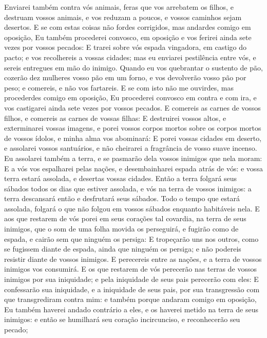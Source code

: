 {{  Enviarei também contra vós animais, feras que vos arrebatem os filhos, e destruam vossos animais, e vos reduzam a poucos, e vossos caminhos sejam desertos.
  E se com estas coisas não fordes corrigidos, mas andardes comigo em oposição, %
  Eu também procederei convosco, em oposição e vos ferirei ainda sete vezes por vossos pecados:
  E trarei sobre vós espada vingadora, em castigo do pacto; e vos recolhereis a vossas cidades; mas eu enviarei pestilência entre vós, e sereis entregues em mão do inimigo.
  Quando eu vos quebrantar o sustento de pão, cozerão dez mulheres vosso pão em um forno, e vos devolverão vosso pão por peso; e comereis, e não vos fartareis.
  E se com isto não me ouvirdes, mas procederdes comigo em oposição,
  Eu procederei convosco em contra e com ira, e vos castigarei ainda sete vezes por vossos pecados.
  E comereis as carnes de vossos filhos, e comereis as carnes de vossas filhas:
  E destruirei vossos altos, e exterminarei vossas imagens, e porei vossos corpos mortos sobre os corpos mortos de vossos ídolos, e minha alma vos abominará: %
  E porei vossas cidades em deserto, e assolarei vossos santuários, e não cheirarei a fragrância de vosso suave incenso.
  Eu assolarei também a terra, e se pasmarão dela vossos inimigos que nela moram:
  E a vós vos espalharei pelas nações, e desembainharei espada atrás de vós: e vossa terra estará assolada, e desertas vossas cidades.
  Então a terra folgará seus sábados todos os dias que estiver assolada, e vós na terra de vossos inimigos: a terra descansará então e desfrutará seus sábados.
  Todo o tempo que estará assolada, folgará o que não folgou em vossos sábados enquanto habitáveis nela.
  E aos que restarem de vós porei em seus corações tal covardia, na terra de seus inimigos, que o som de uma folha movida os perseguirá, e fugirão como de espada, e cairão sem que ninguém os persiga:
  E tropeçarão uns nos outros, como se fugissem diante de espada, ainda que ninguém os persiga; e não podereis resistir diante de vossos inimigos.
  E perecereis entre as nações, e a terra de vossos inimigos vos consumirá.
  E os que restarem de vós perecerão nas terras de vossos inimigos por sua iniquidade; e pela iniquidade de seus pais perecerão com eles:
  E confessarão sua iniquidade, e a iniquidade de seus pais, por sua transgressão com que transgrediram contra mim: e também porque andaram comigo em oposição,
  Eu também haverei andado contrário a eles, e os haverei metido na terra de seus inimigos: e então se humilhará seu coração incircunciso, e reconhecerão seu pecado;
}}

